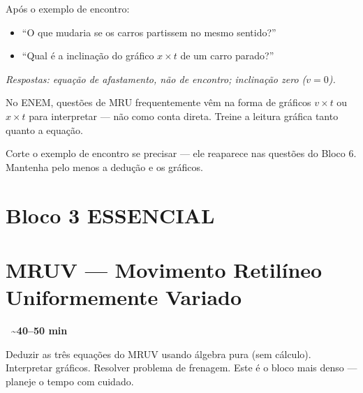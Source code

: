 \documentclass[12pt,a4paper]{article}
\newcommand{\tempo}[1]{%
  \begin{flushright}
    \colorbox{azulphysics!20}{\small\textbf{\faClock\ \textasciitilde{}#1 min}}
  \end{flushright}\vspace{-0.5em}
}
\begin{document}
\begin{tcolorbox}[perguntabox]
  Ap\'os o exemplo de encontro:
  \begin{itemize}[nosep]
    \item ``O que mudaria se os carros partissem no mesmo sentido?''
    \item ``Qual \'e a inclina\c{c}\~ao do gr\'afico $x \times t$ de um
          carro parado?''
  \end{itemize}
  \textit{Respostas: equa\c{c}\~ao de afastamento, n\~ao de encontro;
  inclina\c{c}\~ao zero ($v = 0$).}
\end{tcolorbox}

\begin{tcolorbox}[dicabox]
  No ENEM, quest\~oes de MRU frequentemente vêm na forma de gr\'aficos
  $v \times t$ ou $x \times t$ para interpretar --- n\~ao como conta direta.
  Treine a leitura gr\'afica tanto quanto a equa\c{c}\~ao.
\end{tcolorbox}

\begin{tcolorbox}[cortebox]
  Corte o exemplo de encontro se precisar --- ele reaparece nas
  quest\~oes do Bloco 6. Mantenha pelo menos a dedu\c{c}\~ao e os gr\'aficos.
\end{tcolorbox}

\newpage

\section*{Bloco 3 \hfill\colorbox{verdeok!30}{\small ESSENCIAL}}
\section*{\hspace{1.2em}MRUV --- Movimento Retil\'ineo Uniformemente Variado}
\tempo{40--50}

\begin{tcolorbox}[blocobox={Objetivos}]
  Deduzir as tr\^es equa\c{c}\~oes do MRUV usando \'algebra pura
  (sem c\'alculo). Interpretar gr\'aficos. Resolver problema de frenagem.
  Este \'e o bloco mais denso --- planeje o tempo com cuidado.
\end{tcolorbox}
\end{document}
